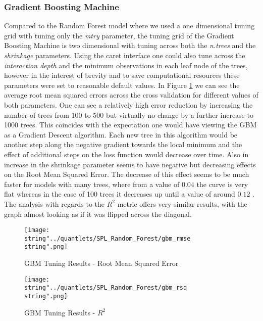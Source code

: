 \subsubsection{Gradient Boosting Machine}
Compared to the Random Forest model where we used a one dimensional tuning grid with tuning only the \textit{mtry} parameter, the tuning grid of the Gradient Boosting Machine is two dimensional with tuning across both the \textit{n.trees} and the \textit{shrinkage} parameters.
Using the caret interface one could also tune across the \textit{interaction depth} and the minimum observations in each leaf node of the trees, however in the interest of brevity and to save computational resources these parameters were set to reasonable default values. 
In Figure \ref{fig:gmb_rmse} we can see the average root mean squared errors across the cross validation for different values of both parameters. One can see a relatively high error reduction by increasing the number of trees from 100 to 500 but virtually no change by a further increase to 1000 trees. This coincides with the expectation one would have viewing the GBM as a Gradient Descent algorithm. Each new tree in this algorithm would be another step along the negative gradient towards the local minimum and the effect of additional steps on the loss function would decrease over time. Also in increase in the shrinkage parameter seems to have negative but decreasing effects on the Root Mean Squared Error. The decrease of this effect seems to be much faster for models with many trees, where from a value of $0.04$ the curve is very flat whereas in the case of 100 trees it decreases up until a value of around $0.12$ . The analysis with regards to the $R^2$ metric offers very similar results, with the graph almost looking as if it was flipped across the diagonal. 


\begin{figure}
  \centering
\texttt{[image: \\string"../quantlets/SPL\_Random\_Forest/gbm\_rmse\\string".png]}
  \caption{GBM Tuning Results - Root Mean Squared Error}\label{fig:gmb_rmse}
\end{figure}

\begin{figure}
  \centering
\texttt{[image: \\string"../quantlets/SPL\_Random\_Forest/gbm\_rsq\\string".png]}
  \caption{GBM Tuning Results - $R^2$}\label{fig:gbm_rsq}
\end{figure}